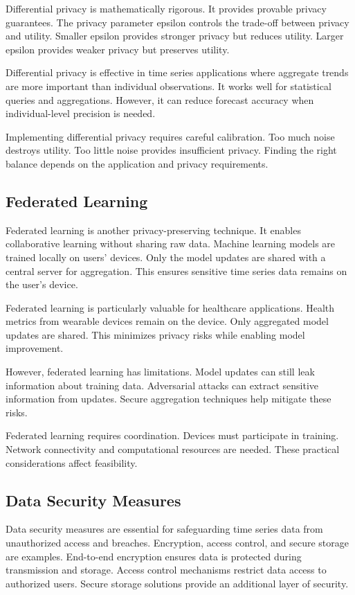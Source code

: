 Differential privacy is mathematically rigorous. It provides provable privacy guarantees. The privacy parameter epsilon controls the trade-off between privacy and utility. Smaller epsilon provides stronger privacy but reduces utility. Larger epsilon provides weaker privacy but preserves utility.

Differential privacy is effective in time series applications where aggregate trends are more important than individual observations. It works well for statistical queries and aggregations. However, it can reduce forecast accuracy when individual-level precision is needed.

Implementing differential privacy requires careful calibration. Too much noise destroys utility. Too little noise provides insufficient privacy. Finding the right balance depends on the application and privacy requirements.

\subsection{Federated Learning}

Federated learning is another privacy-preserving technique. It enables collaborative learning without sharing raw data. Machine learning models are trained locally on users' devices. Only the model updates are shared with a central server for aggregation. This ensures sensitive time series data remains on the user's device.

Federated learning is particularly valuable for healthcare applications. Health metrics from wearable devices remain on the device. Only aggregated model updates are shared. This minimizes privacy risks while enabling model improvement.

However, federated learning has limitations. Model updates can still leak information about training data. Adversarial attacks can extract sensitive information from updates. Secure aggregation techniques help mitigate these risks.

Federated learning requires coordination. Devices must participate in training. Network connectivity and computational resources are needed. These practical considerations affect feasibility.

\subsection{Data Security Measures}

Data security measures are essential for safeguarding time series data from unauthorized access and breaches. Encryption, access control, and secure storage are examples. End-to-end encryption ensures data is protected during transmission and storage. Access control mechanisms restrict data access to authorized users. Secure storage solutions provide an additional layer of security.

